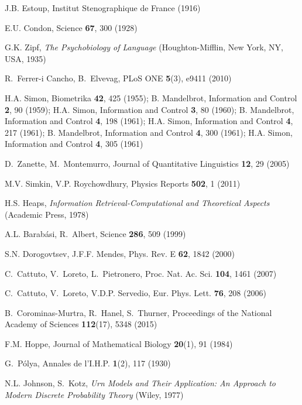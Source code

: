 \documentclass[graybox]{svmult}
\begin{document}
\begin{thebibliography}{10}
J.B. Estoup, Institut Stenographique de France  (1916)

E.U. {Condon}, Science \textbf{67}, 300 (1928)

G.K. Zipf, \emph{The Psychobiology of Language} (Houghton-Mifflin, New York,
  NY, USA, 1935)

R.~Ferrer-i Cancho, B.~Elvevag, PLoS ONE \textbf{5}(3), e9411 (2010)

H.A. Simon, Biometrika \textbf{42}, 425 (1955); B. Mandelbrot, Information and
  Control \textbf{2}, 90 (1959); H.A. Simon, Information and Control
  \textbf{3}, 80 (1960); B. Mandelbrot, Information and Control \textbf{4}, 198
  (1961); H.A. Simon, Information and Control \textbf{4}, 217 (1961); B.
  Mandelbrot, Information and Control \textbf{4}, 300 (1961); H.A. Simon,
  Information and Control \textbf{4}, 305 (1961)

D.~Zanette, M.~Montemurro, Journal of Quantitative Linguistics \textbf{12}, 29
  (2005)

M.V. Simkin, V.P. Roychowdhury, Physics Reports \textbf{502}, 1 (2011)

H.S. Heaps, \emph{Information Retrieval-Computational and Theoretical Aspects}
  (Academic Press, 1978)

A.L. Barab\'asi, R.~Albert, Science \textbf{286}, 509 (1999)

S.N. Dorogovtsev, J.F.F. Mendes, Phys. Rev. E \textbf{62}, 1842 (2000)

C.~Cattuto, V.~Loreto, L.~Pietronero, Proc. Nat. Ac. Sci. \textbf{104}, 1461
  (2007)

C.~Cattuto, V.~Loreto, V.D.P. Servedio, Eur. Phys. Lett. \textbf{76}, 208
  (2006)

B.~Corominas-Murtra, R.~Hanel, S.~Thurner, Proceedings of the National Academy
  of Sciences \textbf{112}(17), 5348 (2015)

F.M. Hoppe, Journal of Mathematical Biology \textbf{20}(1), 91 (1984)

G.~P\'olya, Annales de l'I.H.P. \textbf{1}(2), 117 (1930)

N.L. Johnson, S.~Kotz, \emph{Urn Models and Their Application: An Approach to
  Modern Discrete Probability Theory} (Wiley, 1977)


\end{thebibliography}
\end{document}
